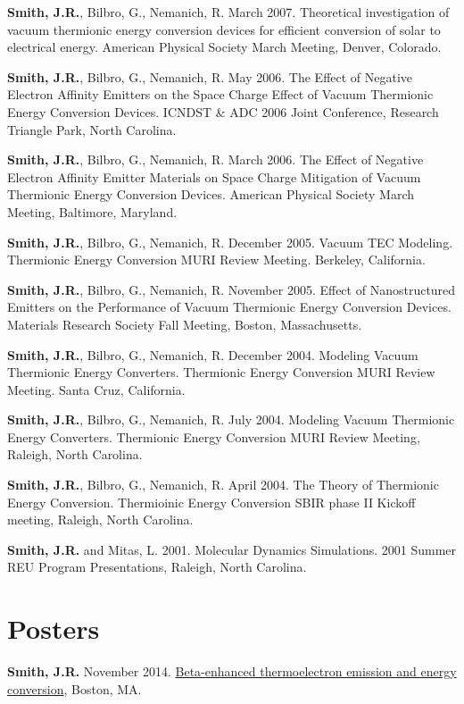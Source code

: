 \textbf{Smith, J.R.}, Bilbro, G., Nemanich, R. March 2007. Theoretical
investigation of vacuum thermionic energy conversion devices for
efficient conversion of solar to electrical energy. American Physical
Society March Meeting, Denver, Colorado.

\textbf{Smith, J.R.}, Bilbro, G., Nemanich, R. May 2006. The Effect of
Negative Electron Affinity Emitters on the Space Charge Effect of Vacuum
Thermionic Energy Conversion Devices. ICNDST \& ADC 2006 Joint
Conference, Research Triangle Park, North Carolina.

\textbf{Smith, J.R.}, Bilbro, G., Nemanich, R. March 2006. The Effect of
Negative Electron Affinity Emitter Materials on Space Charge Mitigation
of Vacuum Thermionic Energy Conversion Devices. American Physical
Society March Meeting, Baltimore, Maryland.

\textbf{Smith, J.R.}, Bilbro, G., Nemanich, R. December 2005. Vacuum TEC
Modeling. Thermionic Energy Conversion MURI Review Meeting. Berkeley,
California.

\textbf{Smith, J.R.}, Bilbro, G., Nemanich, R. November 2005. Effect of
Nanostructured Emitters on the Performance of Vacuum Thermionic Energy
Conversion Devices. Materials Research Society Fall Meeting, Boston,
Massachusetts.

\textbf{Smith, J.R.}, Bilbro, G., Nemanich, R. December 2004. Modeling
Vacuum Thermionic Energy Converters. Thermionic Energy Conversion MURI
Review Meeting. Santa Cruz, California.

\textbf{Smith, J.R.}, Bilbro, G., Nemanich, R. July 2004. Modeling
Vacuum Thermionic Energy Converters. Thermionic Energy Conversion MURI
Review Meeting, Raleigh, North Carolina.

\textbf{Smith, J.R.}, Bilbro, G., Nemanich, R. April 2004. The Theory of
Thermionic Energy Conversion. Thermioinic Energy Conversion SBIR phase
II Kickoff meeting, Raleigh, North Carolina.

\textbf{Smith, J.R.} and Mitas, L. 2001. Molecular Dynamics Simulations.
2001 Summer REU Program Presentations, Raleigh, North Carolina.

\section{Posters}\label{posters}

\textbf{Smith, J.R.} November 2014.
\href{https://github.com/jrsmith3/conf-mrs_fall_2014_poster/releases}{Beta-enhanced
thermoelectron emission and energy conversion}, Boston, MA.

